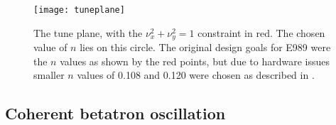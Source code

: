 

\begin{figure}[]
    \centering
    \texttt{[image: tuneplane]}
    \caption[Tune plane]{The tune plane, with the $\nu_{x}^{2} + \nu_{y}^{2} = 1$ constraint in red. The chosen value of $n$ lies on this circle. The original design goals for E989 were the $n$ values as shown by the red points, but due to hardware issues smaller $n$ values of 0.108 and 0.120 were chosen as described in .}
    \label{fig:tuneplane}
\end{figure}



\subsection{Coherent betatron oscillation}


